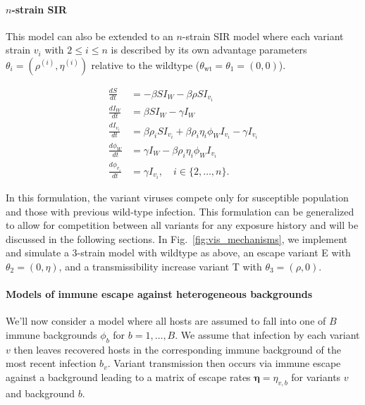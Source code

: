 \documentclass[11pt,oneside,letterpaper]{article}
\renewcommand{\vec}[1]{\boldsymbol{#1}}
\newcommand{\wt}{W}
\newcommand{\varEscape}{\eta}
\newcommand{\varTransmission}{\rho}
\begin{document}
\paragraph{$n$-strain SIR}%

This model can also be extended to an $n$-strain SIR model where each variant strain $v_i$ with $2\leq i \leq n$ is described by its own advantage parameters $\theta_{i} = (\varTransmission^{(i)}, \varEscape ^{(i)})$  relative to the wildtype ($\theta_{\text{wt}} = \theta_{1} = (0, 0)$).

\begin{align*}
    \frac{d S}{d t} &= - \beta S I_{\wt} - \beta \varTransmission S I_{v_{i}}\\
    \frac{d I_{\wt}}{dt} &= \beta S I_{\wt} - \gamma I_{\wt}\\
    \frac{d I_{v_{i}}}{dt} &= \beta \varTransmission_i S I_{v_{i}} + \beta \varTransmission_i \varEscape_i \phi_{\wt} I_{v_{i}} - \gamma I_{v_{i}}\\
    \frac{d \phi_{\wt}}{dt} &= \gamma I_{\wt} - \beta \varTransmission_i \varEscape_i \phi_{\wt} I_{v_{i}}\\
    \frac{d \phi_{v_{i}}}{dt} &= \gamma I_{v_{i}}, \quad i \in \{2, \ldots, n\}.
\end{align*}

In this formulation, the variant viruses compete only for susceptible population and those with previous wild-type infection.
This formulation can be generalized to allow for competition between all variants for any exposure history and will be discussed in the following sections.
In Fig.~\ref{fig:vis_mechanisms}, we implement and simulate a 3-strain model with wildtype as above, an escape variant E with $\theta_{2} = (0, \varEscape)$, and a transmissibility increase variant T with $\theta_{3} = (\varTransmission, 0)$.

\paragraph{Models of immune escape against heterogeneous backgrounds}%

We'll now consider a model where all hosts are assumed to fall into one of $B$ immune backgrounds $\phi_{b}$ for $b =1, \ldots, B$.
We assume that infection by each variant $v$ then leaves recovered hosts in the corresponding immune background of the most recent infection $b_{v}$.
Variant transmission then occurs via immune escape against a background leading to a matrix of escape rates $\vec{\varEscape} = \varEscape_{v,b}$ for variants $v$ and background $b$.
\end{document}
